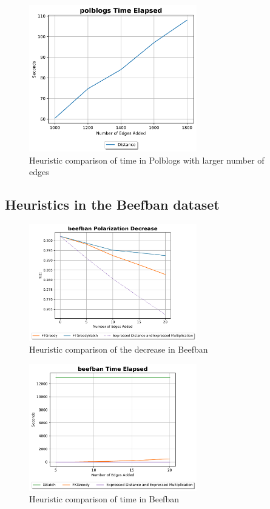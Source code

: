\begin{table}[H]
\begin{figure}[H]
	\centering
	\includegraphics[width=0.65\textwidth]{Figures/polblogs Time Elapsed 2}
	\caption{Heuristic comparison of time in Polblogs with larger number of edges}
	\label{fig:polblogs2_time}
\end{figure}

\clearpage


\subsection{Heuristics in the Beefban dataset}
\begin{figure}[H]
	\centering
	\includegraphics[width=0.65\textwidth]{Figures/beefban Polarization Decrease}
	\caption{Heuristic comparison of the decrease in Beefban}
	\label{fig:beefban_pol}
\end{figure}


\begin{figure}[H]
	\centering
	\includegraphics[width=0.65\textwidth]{Figures/beefban Time Elapsed}
	\caption{Heuristic comparison of time in Beefban}
	\label{fig:beefban_time}
\end{figure}


\end{table}
